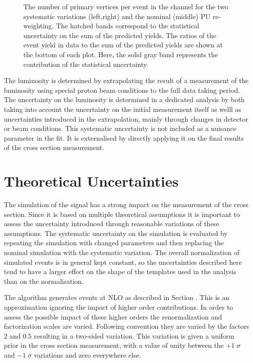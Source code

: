 \begin{figure}[htbp!]
\begin{center}
\caption{The number of primary vertices per event in the \emu channel for the two systematic variations (left,right) and the nominal (middle)  PU re-weighting.
The hatched bands correspond to the statistical uncertainty on the sum of the predicted yields. 
        The ratios of the event yield in data to the sum of the predicted yields are
        shown at the bottom of each plot. Here, the solid gray band
        represents the contribution of the statistical uncertainty.
  \label{fig:control_var_PU}}
  \end{center}
\end{figure}


The luminosity is determined by extrapolating the result of a measurement  of the luminosity using special proton beam conditions to the full data taking period.
The uncertainty on the luminosity is determined in a dedicated analysis by both taking into account the uncertainty on the initial measurement itself as welll as uncertainties
introduced in the extrapolation, mainly through changes in detector or beam conditions.
This systematic uncertainty is not included as a nuisance parameter in the fit. It is externalised by directly applying it on the final results of the cross section measurement.

\section{Theoretical Uncertainties}
\label{sec:theo_uncert}

The simulation of the \ttbar signal has a strong impact on the measurement of the \ttbar cross section.
Since it is based on multiple theoretical assumptions it is important to assess the uncertainty introduced through reasonable variations of these assumptions.
The systematic uncertainty on the simulation is evaluated by repeating the simulation with changed parameters and then replacing the nominal simulation with the systematic variation.
The overall normalization of simulated \ttbar events is in general kept constant, so the uncertainties described here tend to have a larger effect on the shape of the templates used
in the analysis than on the normalisation.

The \POWHEG algorithm generates \ttbar events at NLO as described in Section .
This is an approximation ignoring the impact of higher order contributions. In order to assess the possible impact of these higher orders the renormalization and factorization scales are
varied. Following convention  they are varied by the factors $2$ and $0.5$ resulting in a two-sided variation.
This variation is given a uniform prior in the cross section measurement, with a value of unity between the $+1 \; \sigma$ and $-1 \; \sigma$ variations and zero everywhere else.

